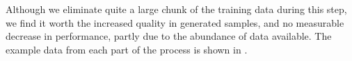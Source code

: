 Although we eliminate quite a large chunk of the training data during this step, we find it worth the increased quality in generated samples, and no measurable decrease in performance, partly due to the abundance of data available. The example data from each part of the process is shown in .



